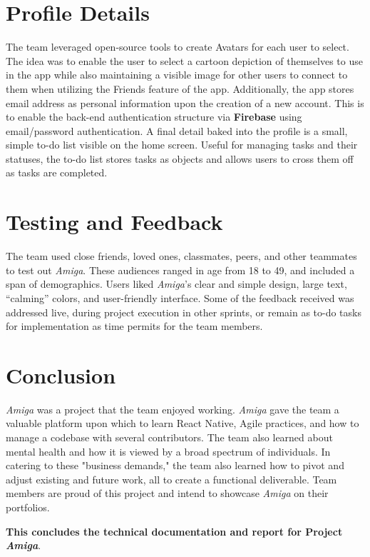 \documentclass[10pt,american english]{article}
\begin{document}
\section*{Profile Details}
The team leveraged open-source tools to create Avatars for each user to select. The idea was to enable the user to select a cartoon depiction of themselves to use in the app while also maintaining a visible image for other users to connect to them when utilizing the Friends feature of the app.
\newline
\newline
Additionally, the app stores email address as personal information upon the creation of a new account. This is to enable the back-end authentication structure via \textbf{Firebase} using email/password authentication.
\newline
\newline
A final detail baked into the profile is a small, simple to-do list visible on the home screen. Useful for managing tasks and their statuses, the to-do list stores tasks as objects and allows users to cross them off as tasks are completed.

\section*{Testing and Feedback}
The team used close friends, loved ones, classmates, peers, and other teammates to test out \textit{Amiga}. These audiences ranged in age from 18 to 49, and included a span of demographics. Users liked \textit{Amiga}'s clear and simple design, large text, ``calming'' colors, and user-friendly interface. Some of the feedback received was addressed live, during project execution in other sprints, or remain as to-do tasks for implementation as time permits for the team members.

\section*{Conclusion}

\textit{Amiga} was a project that the team enjoyed working. \textit{Amiga} gave the team a valuable platform upon which to learn React Native, Agile practices, and how to manage a codebase with several contributors. The team also learned about mental health and how it is viewed by a broad spectrum of individuals. In catering to these "business demands," the team also learned how to pivot and adjust existing and future work, all to create a functional deliverable. Team members are proud of this project and intend to showcase \textit{Amiga} on their portfolios.
\newline
\begin{center}
    \textbf{This concludes the technical documentation and report for Project \textit{Amiga}}.
\end{center}
\end{document}
